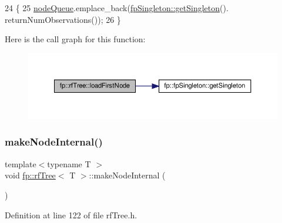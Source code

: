 \begin{DoxyCode}
24                                     \{
25                     \hyperlink{classfp_1_1rfTree_af72d0a2f930fd480dfb4858885c2df23}{nodeQueue}.emplace\_back(\hyperlink{classfp_1_1fpSingleton_a8bdae77b68521003e3fc630edec2e240}{fpSingleton::getSingleton}().
      returnNumObservations());
26                 \}
\end{DoxyCode}
Here is the call graph for this function\+:
\nopagebreak
\begin{figure}[H]
\begin{center}
\leavevmode
\includegraphics[width=350pt]{classfp_1_1rfTree_a8757adc28b68d0a99f95b8bc5d6a38db_cgraph}
\end{center}
\end{figure}
\mbox{\label{classfp_1_1rfTree_aaf7bbdde5f7313c3e84853bbf5fdf792}} 
\subsubsection{\texorpdfstring{make\+Node\+Internal()}{makeNodeInternal()}\hspace{0.1cm}{\footnotesize\ttfamily [1/2]}}
{\footnotesize\ttfamily template$<$typename T $>$ \\
void \hyperlink{classfp_1_1rfTree}{fp\+::rf\+Tree}$<$ T $>$\+::make\+Node\+Internal (\begin{DoxyParamCaption}{ }\end{DoxyParamCaption})\hspace{0.3cm}{\ttfamily [inline]}}



Definition at line 122 of file rf\+Tree.\+h.


